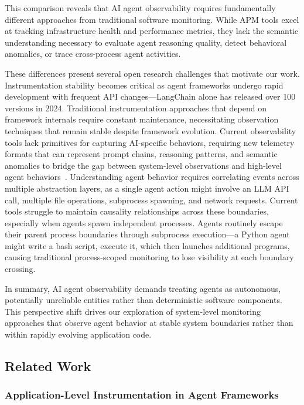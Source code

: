 This comparison reveals that AI agent observability requires fundamentally different approaches from traditional software monitoring. While APM tools excel at tracking infrastructure health and performance metrics, they lack the semantic understanding necessary to evaluate agent reasoning quality, detect behavioral anomalies, or trace cross-process agent activities.

These differences present several open research challenges that motivate our work. Instrumentation stability becomes critical as agent frameworks undergo rapid development with frequent API changes—LangChain alone has released over 100 versions in 2024. Traditional instrumentation approaches that depend on framework internals require constant maintenance, necessitating observation techniques that remain stable despite framework evolution. Current observability tools lack primitives for capturing AI-specific behaviors, requiring new telemetry formats that can represent prompt chains, reasoning patterns, and semantic anomalies to bridge the gap between system-level observations and high-level agent behaviors~\cite{semconv}. Understanding agent behavior requires correlating events across multiple abstraction layers, as a single agent action might involve an LLM API call, multiple file operations, subprocess spawning, and network requests. Current tools struggle to maintain causality relationships across these boundaries, especially when agents spawn independent processes. Agents routinely escape their parent process boundaries through subprocess execution—a Python agent might write a bash script, execute it, which then launches additional programs, causing traditional process-scoped monitoring to lose visibility at each boundary crossing.

In summary, AI agent observability demands treating agents as autonomous, potentially unreliable entities rather than deterministic software components. This perspective shift drives our exploration of system-level monitoring approaches that observe agent behavior at stable system boundaries rather than within rapidly evolving application code.

\subsection{Related Work}

\subsubsection{Application-Level Instrumentation in Agent Frameworks}

